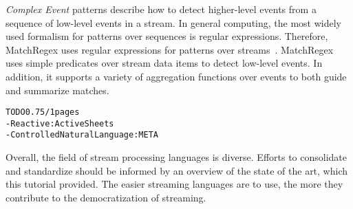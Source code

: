 \emph{Complex Event} patterns describe how to detect higher-level
events from a sequence of low-level events in a stream. In general
computing, the most widely used formalism for patterns over sequences
is regular expressions. Therefore, MatchRegex uses regular expressions
for patterns over streams~\cite{hirzel_2012}. Match\-Regex uses simple
predicates over stream data items to detect low-level events. In
addition, it supports a variety of aggregation functions over events
to both guide and summarize matches.

\begin{alltt}TODO\scriptsize 0.75/1 pages
- Reactive: ActiveSheets \cite{hirzel_et_al_2016}
- Controlled Natural Language: META \cite{arnold_et_al_2016}
\end{alltt}

Overall, the field of stream processing languages is diverse.  Efforts
to consolidate and standardize should be informed by an overview of
the state of the art, which this tutorial provided. The easier
streaming languages are to use, the more they contribute to the
democratization of streaming.
